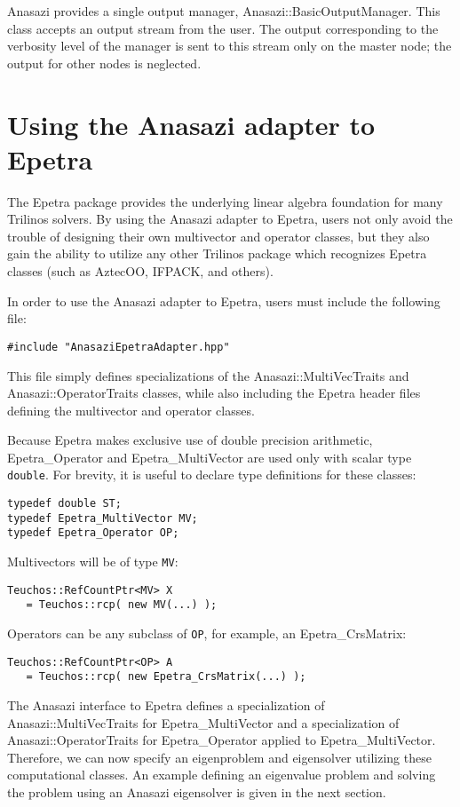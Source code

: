 Anasazi provides a single output manager, Anasazi::BasicOutputManager. This class accepts
an output stream from the user. The output corresponding to the verbosity level of the
manager is sent to this stream only on the master node; the output for other nodes is
neglected.

\section{Using the Anasazi adapter to Epetra}
\label{sec:anasazi:epetra}

The Epetra package provides the underlying linear algebra foundation for many
Trilinos solvers.  By using the Anasazi adapter to Epetra, users not only
avoid the trouble of designing their own multivector and operator classes, but
they also gain the ability to utilize any other Trilinos package which
recognizes Epetra classes (such as AztecOO, IFPACK, and others).

In order to use the Anasazi adapter to Epetra, users must include the following
file:
\begin{verbatim}
#include "AnasaziEpetraAdapter.hpp"
\end{verbatim}
This file simply defines specializations of the Anasazi::MultiVecTraits
and Anasazi::Operator\-Traits classes, while also including the Epetra
header files defining the multivector and operator classes.

Because Epetra makes exclusive use of double precision arithmetic, 
Epetra\_Operator and Epetra\_MultiVector are used only with 
scalar type \verb!double!. For brevity, it is useful to declare type definitions
for these classes:
\begin{verbatim}
typedef double ST;
typedef Epetra_MultiVector MV;
typedef Epetra_Operator OP;
\end{verbatim}

\noindent Multivectors will be of type \verb!MV!:
\begin{verbatim}
Teuchos::RefCountPtr<MV> X 
   = Teuchos::rcp( new MV(...) );
\end{verbatim}

\noindent Operators can be any subclass of \verb!OP!, for example, an Epetra\_CrsMatrix:
\begin{verbatim}
Teuchos::RefCountPtr<OP> A 
   = Teuchos::rcp( new Epetra_CrsMatrix(...) );
\end{verbatim}

The Anasazi interface to Epetra defines a specialization of
Anasazi::MultiVecTraits for Epetra\_MultiVector and a
specialization of Anasazi::OperatorTraits for Epetra\_Operator
applied to Epetra\_MultiVector. Therefore, we can now specify an
eigenproblem and eigensolver utilizing these computational classes. An example
defining an eigenvalue problem and solving the problem using an Anasazi
eigensolver is given in the next section.



